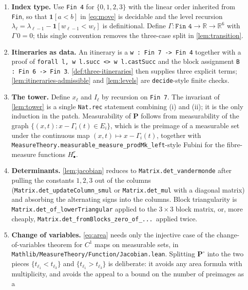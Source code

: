 \documentclass[11pt]{article}
\newcommand{\R}{\mathbb{R}}
\newcommand{\one}{\mathbf{1}}
\newcommand{\Idx}{\{0,1,2,3\}}
\begin{document}
\begin{enumerate}[label=\textbf{L\arabic*.}]
  \item \textbf{Index type.}  Use \texttt{Fin 4} for $\Idx$ with the
    linear order inherited from \texttt{Fin}, so that $\one[a<b]$ in
    \eqref{eq:move} is decidable and the level recursion
    $\lambda_\ell=\lambda_{\ell-1}-\one[w_{\ell-1}<w_\ell]$ is definitional.
    Define $\Gamma:\texttt{Fin 4}\to\R\to\R^6$ with $\Gamma\,0=0$; this single
    convention removes the three-case split in \cref{lem:transition}.
  \item \textbf{Itineraries as data.}  An itinerary is a
    \texttt{w : Fin 7 -> Fin 4} together with a proof of
    \texttt{forall l, w l.succ <> w l.castSucc} and the block assignment
    \texttt{B : Fin 6 -> Fin 3}.  \cref{def:three-itineraries} then supplies three
    explicit terms; \cref{lem:itineraries-admissible} and \cref{lem:levels} are
    \texttt{decide}-style finite checks.
  \item \textbf{The tower.}  Define $x_\ell$ and $I_\ell$ by recursion on
    \texttt{Fin 7}.  The invariant of \cref{lem:tower} is a single
    \texttt{Nat.rec} statement combining (i) and (ii); it is the only induction in
    the patch.  Measurability of $\mathbf P$ follows from measurability of the
    graph $\{(x,t): x-\Gamma_i(t)\in E_i\}$, which is the preimage of a measurable
    set under the continuous map $(x,t)\mapsto x-\Gamma_i(t)$, together with
    \texttt{MeasureTheory.measurable\_measure\_prodMk\_left}-style Fubini for the
    fibre-measure functions $H^r_\bullet$.
  \item \textbf{Determinants.}  \cref{lem:jacobian} reduces to
    \texttt{Matrix.det\_vandermonde} after pulling the constants $1,2,3$ out of
    the columns (\texttt{Matrix.det\_updateColumn\_smul} or
    \texttt{Matrix.det\_mul} with a diagonal matrix) and absorbing the alternating
    signs into the columns.  Block triangularity is
    \texttt{Matrix.det\_of\_lowerTriangular} applied to the $3\times3$ block
    matrix, or, more cheaply, \texttt{Matrix.det\_fromBlocks\_zero\_of\_...}~applied
    twice.
  \item \textbf{Change of variables.}  \eqref{eq:area} needs only the injective
    case of the change-of-variables theorem for $C^1$ maps on measurable sets, in
    \texttt{Mathlib/MeasureTheory/Function/Jacobian.lean}.  Splitting
    $\mathbf P^\circ$ into the two pieces $\{t_{\ell_1}<t_{\ell_3}\}$ and
    $\{t_{\ell_1}>t_{\ell_3}\}$ is deliberate: it avoids any area formula with
    multiplicity, and avoids the appeal to a bound on the number of preimages as a

\end{enumerate}
\end{document}
